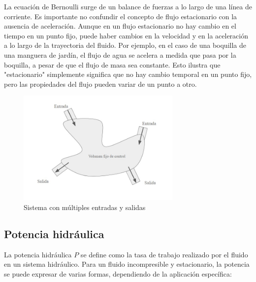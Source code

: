 \documentclass[10pt, oneside]{article}
\begin{document}
La ecuación de Bernoulli surge de un balance de fuerzas a lo largo de una línea de corriente. Es importante no confundir el concepto de flujo estacionario con la ausencia de aceleración. Aunque en un flujo estacionario no hay cambio en el tiempo en un punto fijo, puede haber cambios en la velocidad y en la aceleración a lo largo de la trayectoria del fluido. Por ejemplo, en el caso de una boquilla de una manguera de jardín, el flujo de agua se acelera a medida que pasa por la boquilla, a pesar de que el flujo de masa sea constante. Esto ilustra que "estacionario" simplemente significa que no hay cambio temporal en un punto fijo, pero las propiedades del flujo pueden variar de un punto a otro.


\begin{figure}[h]
\centering
\includegraphics[width=8cm]{Fig.3.jpg}
\caption{Sistema con múltiples entradas y salidas}
\label{eulan}
\end{figure}
\subsection{Potencia hidráulica}

La potencia hidráulica \( P \) se define como la tasa de trabajo realizado por el fluido en un sistema hidráulico. Para un fluido incompresible y estacionario, la potencia se puede expresar de varias formas, dependiendo de la aplicación específica:
\end{document}
